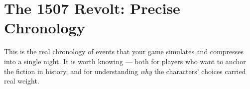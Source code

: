 \section{The 1507 Revolt: Precise Chronology}
\label{sec:revolt-chronology}


This is the real chronology of events that your game simulates and
compresses into a single night. It is worth knowing --- both for players
who want to anchor the fiction in history, and for understanding
\textit{why} the characters' choices carried real weight.

